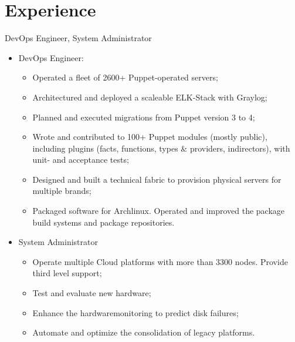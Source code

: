 \documentclass[11pt,a4paper,nolmodern]{moderncv}
\begin{document}
\newpage

\section{Experience}

%
  {DevOps Engineer, System Administrator
\begin{itemize}
  \item DevOps Engineer:
    \begin{itemize}
      \item Operated a fleet of 2600+ Puppet-operated servers;
      \item Architectured and deployed a scaleable ELK-Stack with Graylog;
      \item Planned and executed migrations from Puppet version 3 to 4;
      \item Wrote and contributed to 100+ Puppet modules (mostly public), including plugins (facts, functions, types \& providers, indirectors), with unit- and acceptance tests;
      \item Designed and built a technical fabric to provision physical servers for multiple brands;
      \item Packaged software for Archlinux. Operated and improved the package build systems and package repositories.
    \end{itemize}
  \item System Administrator
    \begin{itemize}
      \item Operate multiple Cloud platforms with more than 3300 nodes. Provide third level support;
      \item Test and evaluate new hardware;
      \item Enhance the hardwaremonitoring to predict disk failures;
      \item Automate and optimize the consolidation of legacy platforms.
    \end{itemize}
\end{itemize}}
\end{document}
